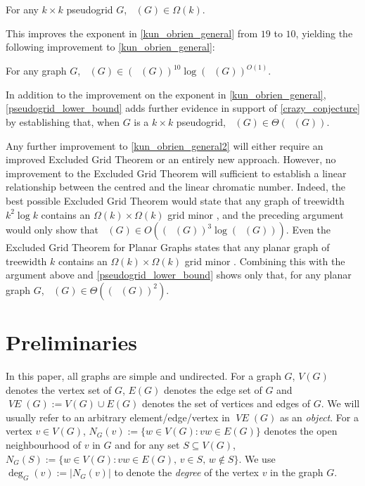 \documentclass{patmorin}
\newcommand{\defin}[1]{\emph{\color{brightmaroon}#1}}
\DeclareMathOperator{\chicen}{\chi_{\mathrm{cen}}}
\DeclareMathOperator{\chilin}{\chi_{\mathrm{lin}}}
\DeclareMathOperator{\VE}{\mathit{VE}}
\begin{document}
\begin{lem}\label{pseudogrid_lower_bound}
  For any $k\times k$ pseudogrid $G$, $\chilin(G)\in\Omega(k)$.
\end{lem}

This improves the exponent in \cref{kun_obrien_general} from $19$ to $10$, yielding the following improvement to \cref{kun_obrien_general}:

\begin{thm}\label{kun_obrien_general2}
  For any graph $G$, $\chicen(G)\in (\chilin(G))^{10}\log(\chilin(G))^{O(1)}$.
\end{thm}

In addition to the improvement on the exponent in \cref{kun_obrien_general}, \cref{pseudogrid_lower_bound} adds further evidence in support of \cref{crazy_conjecture} by establishing that, when $G$ is a $k\times k$ pseudogrid, $\chicen(G)\in\Theta(\chilin(G))$.

Any further improvement to \cref{kun_obrien_general2} will either require an improved Excluded Grid Theorem or an entirely new approach. However, no improvement to the Excluded Grid Theorem will sufficient to establish a linear relationship between the centred and the linear chromatic number.  Indeed, the best possible Excluded Grid Theorem would state that any graph of treewidth $k^2\log k$ contains an $\Omega(k)\times\Omega(k)$ grid minor \cite{robertson.seymour.ea:quickly}, and the preceding argument would only show that $\chicen(G)\in O((\chilin(G))^3\log(\chilin(G)))$.  Even the Excluded Grid Theorem for Planar Graphs states that any planar graph of treewidth $k$ contains an $\Omega(k)\times\Omega(k)$ grid minor
\cite{robertson.seymour.ea:quickly}.
Combining this with the argument above and \cref{pseudogrid_lower_bound} shows only that, for any planar graph $G$, $\chicen(G)\in\Theta((\chilin(G))^2)$.


\section{Preliminaries}

In this paper, all graphs are simple and undirected. For a graph $G$, $V(G)$ denotes the vertex set of $G$, $E(G)$ denotes the edge set of $G$ and $\VE(G):=V(G)\cup E(G)$ denotes the set of vertices and edges of $G$. We will usually refer to an arbitrary element/edge/vertex in $\VE(G)$ as an \defin{object}. For a vertex $v\in V(G)$,  $N_G(v):=\{w\in V(G):vw\in E(G)\}$  denotes the open neighbourhood of $v$ in $G$ and for any set $S\subseteq V(G)$, $N_G(S):=\{w\in V(G):vw\in E(G),\, v\in S,\, w\not\in S\}$.  We use $\deg_G(v):=|N_G(v)|$ to denote the \defin{degree} of the vertex $v$ in the graph $G$.
\end{document}

